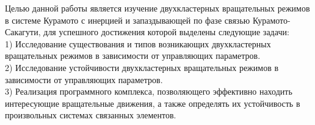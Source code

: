 Целью данной работы является изучение двухкластерных вращательных режимов в системе Курамото
с инерцией и запаздывающей по фазе связью Курамото-Сакагути, для успешного достижения которой выделены следующие задачи: \\
1) Исследование существования и типов возникающих двухкластерных вращательных режимов в зависимости от управляющих параметров. \\
2) Исследование устойчивости двухкластерных вращательных режимов в зависимости от управляющих параметров. \\
3) Реализация программного комплекса, позволяющего эффективно находить интересующие вращательные движения, а также определять
их устойчивость в произвольных системах связанных элементов.
